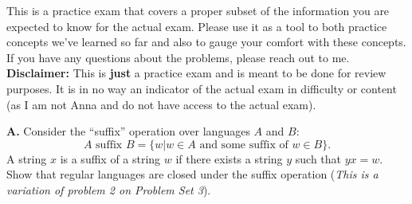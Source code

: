 \documentclass[10pt]{article}
\begin{document}
\noindent
This is a practice exam that covers a proper subset of the information you are expected to know for the actual exam. Please use it as a tool to both practice concepts we've learned so far and also to gauge your comfort with these concepts.\\

\noindent
If you have any questions about the problems, please reach out to me.\\

\noindent
\textbf{Disclaimer: }This is \textbf{just} a practice exam and is meant to be done for review purposes. It is in no way an indicator of the actual exam in difficulty or content (as I am not Anna and do not have access to the actual exam).

\newpage
\noindent
\textbf{A.} Consider the ``suffix'' operation over languages $A$ and $B$:
\[A\text{ suffix } B=\{w|w\in A \text{ and some suffix of }w\in B \}.\]
A string $x$ is a suffix of a string $w$ if there exists a string $y$ such that $yx=w.$ Show that regular languages are closed under the suffix operation
(\textit{This is a variation of problem 2 on Problem Set 3}).\\





    
    
\end{document}
